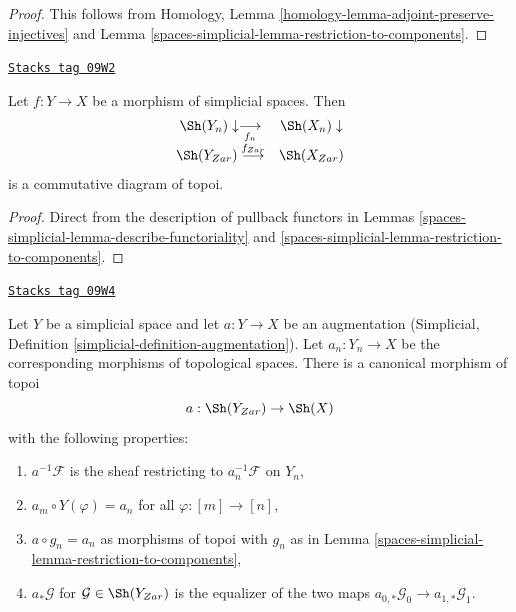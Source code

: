 \begin{proof}
This follows from
Homology, Lemma \ref{homology-lemma-adjoint-preserve-injectives}
and
Lemma \ref{spaces-simplicial-lemma-restriction-to-components}.
\end{proof}

\begin{lemma}
\label{spaces-simplicial-lemma-restriction-to-components-functorial}
\href{https://stacks.math.columbia.edu/tag/09W2}{\texttt{Stacks tag 09W2}}

Let $f : Y \to X$ be a morphism of simplicial spaces. Then
$$
\begin{array}{cc}\Sh(Y_n) \downarrow\underset{f_n}{\longrightarrow} & \Sh(X_n) \downarrow \\ \Sh(Y_{Zar}) \overset{f_{Zar}}{\longrightarrow} & \Sh(X_{Zar})\end{array}
$$
is a commutative diagram of topoi.
\end{lemma}

\begin{proof}
Direct from the description of pullback functors in
Lemmas \ref{spaces-simplicial-lemma-describe-functoriality} and
\ref{spaces-simplicial-lemma-restriction-to-components}.
\end{proof}

\begin{lemma}[Augmentation]
\label{spaces-simplicial-lemma-augmentation}
\href{https://stacks.math.columbia.edu/tag/09W4}{\texttt{Stacks tag 09W4}}

Let $Y$ be a simplicial space and let $a : Y \to X$ be an augmentation
(Simplicial, Definition \ref{simplicial-definition-augmentation}).
Let $a_n : Y_n \to X$ be the corresponding morphisms of topological spaces.
There is a canonical morphism of topoi
$$
a : \Sh(Y_{Zar}) \to \Sh(X)
$$
with the following properties:
\begin{enumerate}
\item $a^{-1}\mathcal{F}$ is the sheaf restricting to $a_n^{-1}\mathcal{F}$
on $Y_n$,
\item $a_m \circ Y(\varphi) = a_n$ for all $\varphi : [m] \to [n]$,
\item $a \circ g_n = a_n$ as morphisms of topoi with
$g_n$ as in Lemma \ref{spaces-simplicial-lemma-restriction-to-components},
\item $a_*\mathcal{G}$ for $\mathcal{G} \in \Sh(Y_{Zar})$
is the equalizer of the two maps
$a_{0, *}\mathcal{G}_0 \to a_{1, *}\mathcal{G}_1$.
\end{enumerate}
\end{lemma}

